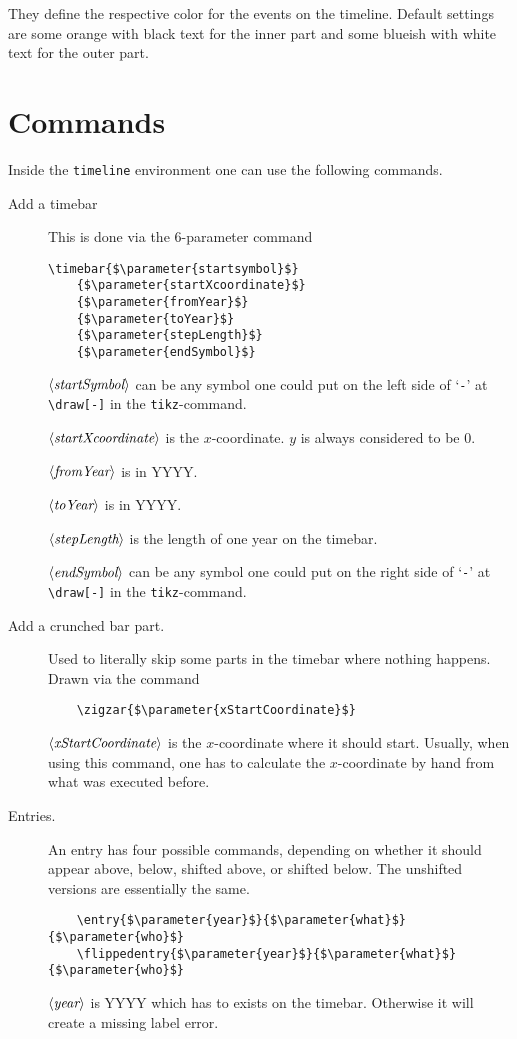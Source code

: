 \documentclass{article}
\newcommand{\parameter}[1]{\langle\normalfont\textit{#1}\rangle}
\begin{document}
They define the respective color for the events on the timeline.
Default settings are some orange  with black text for the inner part and some blueish  with white text for the outer part.

\section{Commands}
Inside the \texttt{timeline} environment one can use the following commands.
\begin{description}
	\item[Add a timebar] This is done via the 6-parameter command
\begin{lstlisting}
\timebar{$\parameter{startsymbol}$}
	{$\parameter{startXcoordinate}$}
	{$\parameter{fromYear}$}
	{$\parameter{toYear}$}
	{$\parameter{stepLength}$}
	{$\parameter{endSymbol}$}
\end{lstlisting}
		$\parameter{startSymbol}$ can be any symbol one could put on the left side of `\verb'-'' at \verb'\draw[-]' in the \texttt{tikz}-command.
		
		$\parameter{startXcoordinate}$ is the $x$-coordinate. $y$ is always considered to be $0$.
		
		$\parameter{fromYear}$ is in YYYY.
		
		$\parameter{toYear}$ is in YYYY.
		
		$\parameter{stepLength}$ is the length of one year on the timebar.
		
		$\parameter{endSymbol}$ can be any symbol one could put on the right side of `\verb'-'' at \verb'\draw[-]' in the \texttt{tikz}-command.
	\item[Add a crunched bar part.] Used to literally skip some parts in the timebar where nothing happens. Drawn via the command
\begin{lstlisting}
	\zigzar{$\parameter{xStartCoordinate}$}
\end{lstlisting}
$\parameter{xStartCoordinate}$ is the $x$-coordinate where it should start. Usually, when using this command, one has to calculate the $x$-coordinate by hand from what was executed before.

\item[Entries.] An entry has four possible commands, depending on whether it should appear above, below, shifted above, or shifted below. The unshifted versions are essentially the same.
\begin{lstlisting}
	\entry{$\parameter{year}$}{$\parameter{what}$}{$\parameter{who}$}
	\flippedentry{$\parameter{year}$}{$\parameter{what}$}{$\parameter{who}$}
\end{lstlisting}
$\parameter{year}$ is YYYY which has to exists on the timebar. Otherwise it will create a missing label error.


\end{description}
\end{document}
